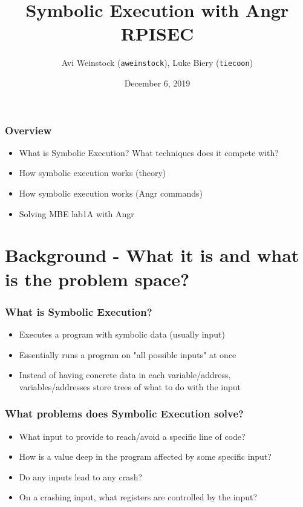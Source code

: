 \documentclass[aspectratio=169]{beamer}
\title{Symbolic Execution with Angr\\RPISEC}
\date{December 6, 2019}
\author{Avi Weinstock (\Verb|aweinstock|), Luke Biery (\Verb|tiecoon|)}
\begin{document}
\maketitle

\begin{frame}[fragile]
\frametitle{Overview}
\begin{itemize}
\item What is Symbolic Execution? What techniques does it compete with?
\item How symbolic execution works (theory)
\item How symbolic execution works (Angr commands)
\item Solving MBE lab1A with Angr
\end{itemize}
\end{frame}

\section{Background - What it is and what is the problem space?}
\begin{frame}[fragile]
\frametitle{What is Symbolic Execution?}
\begin{itemize}
\item Executes a program with symbolic data (usually input)
\item Essentially runs a program on "all possible inputs" at once
\item Instead of having concrete data in each variable/address, \\variables/addresses store trees of what to do with the input
\end{itemize}
\end{frame}

\begin{frame}[fragile]
\frametitle{What problems does Symbolic Execution solve?}
\begin{itemize}
\item What input to provide to reach/avoid a specific line of code?
\item How is a value deep in the program affected by some specific input?
\item Do any inputs lead to any crash?
\item On a crashing input, what registers are controlled by the input?
\end{itemize}
\end{frame}
\end{document}

